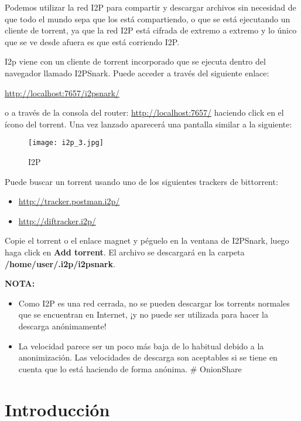 \documentclass[10pt,a5paper,twoside,,]{book}
\begin{document}
Podemos utilizar la red I2P para compartir y descargar archivos sin
necesidad de que todo el mundo sepa que los está compartiendo, o que se
está ejecutando un cliente de torrent, ya que la red I2P está cifrada de
extremo a extremo y lo único que se ve desde afuera es que está
corriendo I2P.

I2p viene con un cliente de torrent incorporado que se ejecuta dentro
del navegador llamado I2PSnark. Puede acceder a través del siguiente
enlace:

\url{http://localhost:7657/i2psnark/}

o a través de la consola del router: \url{http://localhost:7657/}
haciendo click en el ícono del torrent. Una vez lanzado aparecerá una
pantalla similar a la siguiente:

\begin{figure}[htbp]
\centering
\texttt{[image: i2p\_3.jpg]}
\caption{I2P}
\end{figure}

Puede buscar un torrent usando uno de los siguientes trackers de
bittorrent:

\begin{itemize}
\item
  \url{http://tracker.postman.i2p/}
\item
  \url{http://diftracker.i2p/}
\end{itemize}

Copie el torrent o el enlace magnet y péguelo en la ventana de I2PSnark,
luego haga click en \textbf{Add torrent}. El archivo se descargará en la
carpeta \textbf{/home/user/.i2p/i2psnark}.

\textbf{NOTA:}

\begin{itemize}
\item
  Como I2P es una red cerrada, no se pueden descargar los torrents
  normales que se encuentran en Internet, ¡y no puede ser utilizada para
  hacer la descarga anónimamente!
\item
  La velocidad parece ser un poco más baja de lo habitual debido a la
  anonimización. Las velocidades de descarga son aceptables si se tiene
  en cuenta que lo está haciendo de forma anónima. \# OnionShare
\end{itemize}

\section{Introducción}\label{introducciuxf3n-2}
\end{document}
